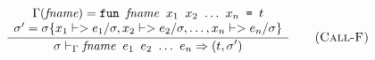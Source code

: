 \documentclass[10pt]{../sigplanconf}
\newcommand{\nfrac}[2]{\frac{\displaystyle{#1}}{\displaystyle{#2}}}
\newcommand{\tagsc}[1]{\tag{\scshape #1}}
\begin{document}
\begin{minipage}{2\linewidth}
\begin{equation}
  \nfrac{
    \begin{array}{c}
      \Gamma(\textit{fname}) =
        \texttt{fun \textit{\rmfamily fname} $x_1$ $x_2$ $\ldots$ $x_n$ = $t$}
        \\
      \sigma' = \sigma\{x_1 |-> e_1/\sigma, x_2 |-> e_2/\sigma, \ldots, x_n |-> e_n/\sigma\} 
    \end{array}
  }{
    \sigma |-_\Gamma \texttt{\textit{\rmfamily fname} $e_1$ $e_2$ $\ldots$ $e_n$} => (t, \sigma')
  } \tagsc{Call-F}
\end{equation}

\label{fig:semantics}
\end{minipage}



\begin{figure*}\centering



\end{figure*}
\end{document}
